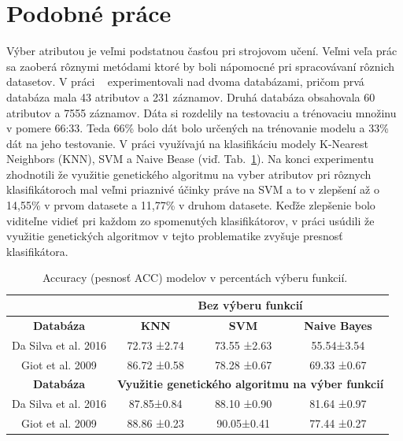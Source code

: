 \documentclass[runningheads]{llncs}
\begin{document}
\section{Podobné práce}

Výber atributou je veľmi podstatnou časťou pri strojovom učení. Veľmi veľa prác sa 
zaoberá rôznymi metódami ktoré by boli nápomocné pri spracovávaní rôznich datasetov.
V práci ~\cite{ref_nascimento} experimentovali nad dvoma databázami, pričom 
prvá databáza mala 43 atributov a 231 záznamov. Druhá databáza obsahovala 60 atributov 
a 7555 záznamov. Dáta si rozdelily na testovaciu a trénovaciu množinu v pomere 66:33. 
Teda 66\% bolo dát bolo určených na trénovanie modelu a 33\% dát na jeho testovanie. 
V práci využívajú na klasifikáciu modely K-Nearest Neighbors (KNN), SVM a Naive Bease (viď. Tab.~\ref{tab_vyber_funkci}). Na konci experimentu zhodnotili 
že využitie genetického algoritmu na vyber atributov pri rôznych klasifikátoroch mal veľmi priaznivé
účinky práve na SVM a to v zlepšení až o 14,55\% v prvom datasete a 11,77\% v druhom datasete.
Keďže zlepšenie bolo viditeľne vidieť pri každom zo spomenutých klasifikátorov, v práci usúdili že
využitie genetických algoritmov v tejto problematike zvyšuje presnosť klasifikátora.

\begin{table}[]
\centering
\caption{Accuracy (pesnosť ACC) modelov v percentách výberu funkcií.~\cite{ref_nascimento}}\label{tab_vyber_funkci}
\begin{tabular}{|c|c|c|c|}
\hline
                     & \multicolumn{3}{c|}{\textbf{Bez výberu funkcií}}                     \\ \hline
\textbf{Databáza}    & \textbf{KNN}          & \textbf{SVM}          & \textbf{Naive Bayes} \\ \hline
Da Silva et al. 2016 & 72.73 ±2.74           & 73.55 ±2.63           & 55.54±3.54           \\ \hline
Giot et al. 2009     & 86.72 ±0.58           & 78.28 ±0.67           & 69.33 ±0.67          \\ \hline
\textbf{Databáza}    & \multicolumn{3}{c|}{\textbf{Využitie genetického algoritmu na výber funkcií}} \\ \hline
Da Silva et al. 2016 & 87.85±0.84            & 88.10 ±0.90           & 81.64 ±0.97          \\ \hline
Giot et al. 2009     & 88.86 ±0.23           & 90.05±0.41            & 77.44 ±0.27          \\ \hline
\end{tabular}
\end{table}
\end{document}
